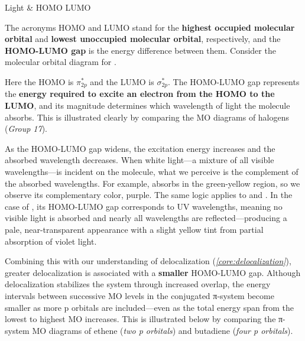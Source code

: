 \documentclass[10pt]{article}
\begin{document}
    \begin{core}[label=core:homo_lumo]{Light \& HOMO LUMO}

      The acronyms HOMO and LUMO stand for the \textbf{highest occupied molecular orbital} and \textbf{lowest unoccupied molecular orbital}, respectively, and the \textbf{HOMO-LUMO gap} is the energy difference between them. Consider the molecular orbital diagram for .


      Here the HOMO is $π^*_{2p}$ and the LUMO is $σ^*_{2p}$. The HOMO-LUMO gap represents the \textbf{energy required to excite an electron from the HOMO to the LUMO}, and its magnitude determines which wavelength of light the molecule absorbs. This is illustrated clearly by comparing the MO diagrams of halogens (\textit{Group 17}).


      As the HOMO-LUMO gap widens, the excitation energy increases and the absorbed wavelength decreases. When white light---a mixture of all visible wavelengths---is incident on the molecule, what we perceive is the complement of the absorbed wavelengths. For example,  absorbs in the green-yellow region, so we observe its complementary color, purple. The same logic applies to  and . In the case of , its HOMO-LUMO gap corresponds to UV wavelengths, meaning no visible light is absorbed and nearly all wavelengths are reflected---producing a pale, near-transparent appearance with a slight yellow tint from partial absorption of violet light.


      Combining this with our understanding of delocalization (\textit{\autoref{core:delocalization}}), greater delocalization is associated with a \textbf{smaller} HOMO-LUMO gap. Although delocalization stabilizes the system through increased overlap, the energy intervals between successive MO levels in the conjugated π-system become smaller as more p orbitals are included---even as the total energy span from the lowest to highest MO increases. This is illustrated below by comparing the π-system MO diagrams of ethene (\textit{two p orbitals}) and butadiene (\textit{four p orbitals}).


\end{core}
\end{document}
